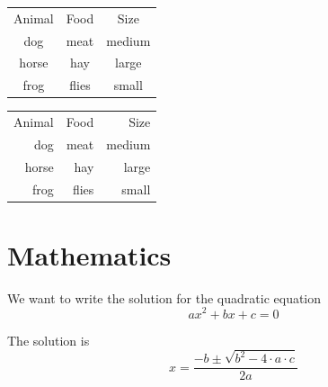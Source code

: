 \documentclass[10pt]{article} %
\begin{document}
\vspace{1cm}

\begin{tabular}{ccc}
    Animal & Food & Size \\
    dog & meat & medium \\
    horse & hay & large \\
    frog & flies & small \\
\end{tabular}

\vspace{1cm}


\begin{tabular}{rrr}
    Animal & Food & Size \\
    dog & meat & medium \\
    horse & hay & large \\
    frog & flies & small \\
\end{tabular}



\newpage

\section{Mathematics}
We want to write the solution for the quadratic equation $$ax^2 +bx+c=0$$

The solution is 
$$
 x= \frac{-b \pm \sqrt{b^2-4\cdot a\cdot c}}{2a}
$$
\end{document}
